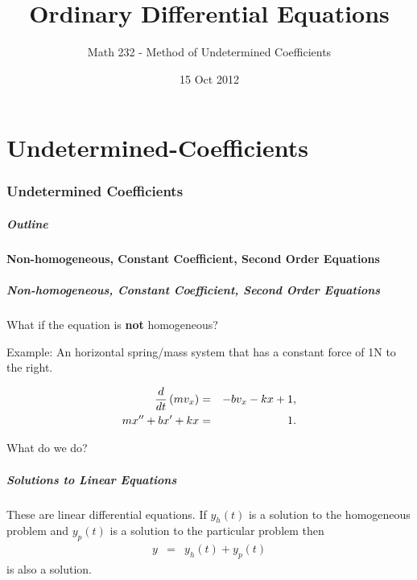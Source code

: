 \part{Undetermined-Coefficients}
\section{Undetermined Coefficients}

\title{Ordinary Differential Equations}
\subtitle{Math 232 - Method of Undetermined Coefficients}
\date{15 Oct 2012}

\begin{frame}
  \titlepage
\end{frame}

\begin{frame}
  \frametitle{Outline}
\end{frame}


\subsection{Non-homogeneous, Constant Coefficient, Second Order Equations}


\begin{frame}
  \frametitle{Non-homogeneous, Constant Coefficient, Second Order
    Equations}
  What if the equation is \textbf{not} homogeneous?

  Example: An horizontal spring/mass system that has a constant force
  of 1N to the right.

  \begin{eqnarray*}
    \frac{d}{dt} \left( m v_x \right) & = & -b v_x - kx + 1, \\
    m x'' + bx' + kx & = & 1.
  \end{eqnarray*}

  What do we do?


\end{frame}


\begin{frame}
  \frametitle{Solutions to Linear Equations}

  These are linear differential equations. If $y_h(t)$ is a solution
  to the homogeneous problem and $y_p(t)$ is a solution to the
  particular problem then
  \begin{eqnarray*}
    y & = & y_h(t) + y_p(t)
  \end{eqnarray*}
  is also a solution.

\end{frame}


